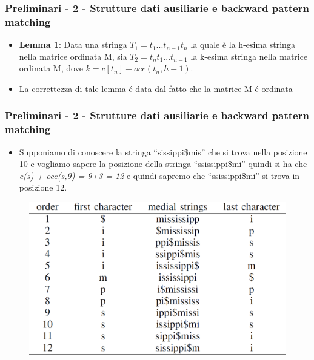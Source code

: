 \documentclass{beamer}
\begin{document}
\begin{frame}
\frametitle{Preliminari - 2 - Strutture dati ausiliarie e backward pattern matching}

	\begin{itemize}
		\item \textbf{Lemma 1}: Data una stringa $ T_{1}=t_{1}...t_{n-1}t_{n}$  la quale è la h-esima stringa nella matrice ordinata M, sia $ T_{2} = t_{n}t_{1}...t_{n-1} $ la k-esima stringa nella matrice ordinata M, dove $ k = c[t_{n}] + occ(t_{n},h-1). $\pause
		\item La correttezza di tale lemma é data dal fatto che la matrice M é ordinata
	\end{itemize}
\end{frame}
\begin{frame}
\frametitle{Preliminari - 2 - Strutture dati ausiliarie e backward pattern matching}

\begin{itemize}
	\item Supponiamo di conoscere la stringa  ``sissippi\$mis'' che si trova nella posizione 10 e vogliamo sapere la posizione della stringa ``ssissippi\$mi'' quindi si ha che \\ \textit{c(s) + occ(s,9) = 9+3 = 12} e quindi sapremo che  ``ssissippi\$mi'' si trova in posizione 12.
\end{itemize}
\begin{figure}
	\centering
	\includegraphics[scale=0.3]{Immagini/BWTExample.PNG}
\end{figure}
\end{frame}
\end{document}
